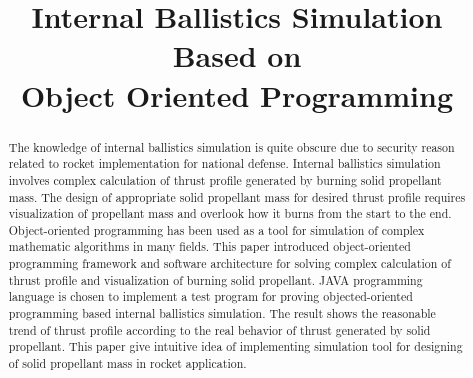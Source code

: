 \documentclass[conference]{IEEEtran}
\begin{document}
\title{Internal Ballistics Simulation Based on \\Object Oriented Programming}

\author{
\and
{}
}









\maketitle


\begin{abstract}
The knowledge of internal ballistics simulation is quite obscure due to security reason related to rocket implementation for national defense. Internal ballistics simulation involves complex calculation of thrust profile generated by burning solid propellant mass. The design of appropriate solid propellant mass for desired thrust profile requires visualization of propellant mass and overlook how it burns from the start to the end. Object-oriented programming has been used as a tool for simulation of complex mathematic algorithms in many fields. This paper introduced object-oriented programming framework and software architecture for solving complex calculation of thrust profile and visualization of burning solid propellant. JAVA programming language is chosen to implement a test program for proving objected-oriented programming based internal ballistics simulation. The result shows the reasonable trend of thrust profile according to the real behavior of thrust generated by solid propellant. This paper give intuitive idea of implementing simulation tool for designing of solid propellant mass in rocket application.
\end{abstract}
\end{document}
